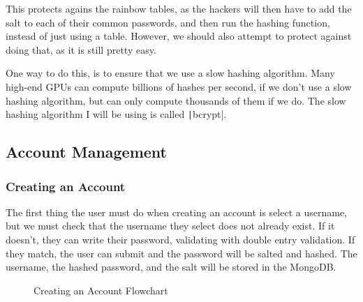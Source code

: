 \documentclass[12pt]{report}
\newcommand{\pil}[1]{\protect\texttt|#1|}
\begin{document}
This protects agains the rainbow tables, as the hackers will then have to add the salt to each of their common passwords, and then run the hashing function, instead of just using a table. However, we should also attempt to protect against doing that, as it is still pretty easy.

One way to do this, is to ensure that we use a slow hashing algorithm. Many high-end GPUs can compute billions of hashes per second, if we don't use a slow hashing algorithm, but can only compute thousands of them if we do. The slow hashing algorithm I will be using is called \pil{bcrypt}.

\subsection{Account Management}\label{sec:accountManagement}
\subsubsection{Creating an Account}
The first thing the user must do when creating an account is select a username, but we must check that the username they select does not already exist. If it doesn't, they can write their password, validating with double entry validation. If they match, the user can submit and the password will be salted and hashed. The username, the hashed password, and the salt will be stored in the MongoDB.

\begin{figure}[H]
\centering
{}
\caption{Creating an Account Flowchart}
\end{figure}
\end{document}
